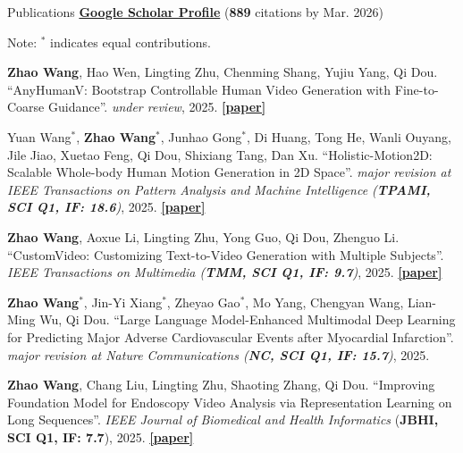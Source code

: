 \documentclass[a4paper]{resume} %
\begin{document}
\begin{rSection}{Publications}
\href{https://scholar.google.com/citations?user=1kEufdwAAAAJ}{\bf Google Scholar Profile} ({\bf 889} citations by Mar. 2026)
\vspace{-0.3em}

Note: {\bf $^*$} indicates equal contributions.

\begin{enumerate}[label={[\arabic*]}, topsep=0em, leftmargin=1.4em, itemsep=-0.5em]

\item {\bf Zhao Wang}, Hao Wen, Lingting Zhu, Chenming Shang, Yujiu Yang, Qi Dou. “AnyHumanV: Bootstrap Controllable Human Video Generation with Fine-to-Coarse Guidance”. {\it under review}, 2025. \href{https://www.arxiv.org/abs/2502.08189}{\bf [paper]}

\item Yuan Wang$^*$, {\bf Zhao Wang}$^*$, Junhao Gong$^*$, Di Huang, Tong He, Wanli Ouyang, Jile Jiao, Xuetao Feng, Qi Dou, Shixiang Tang, Dan Xu. “Holistic-Motion2D: Scalable Whole-body Human Motion Generation in 2D Space”. {\it major revision at IEEE Transactions on Pattern Analysis and Machine Intelligence ({\bf TPAMI, SCI Q1, IF: 18.6})}, 2025. \href{https://arxiv.org/abs/2406.11253}{\bf [paper]}

\item {\bf Zhao Wang}, Aoxue Li, Lingting Zhu, Yong Guo, Qi Dou, Zhenguo Li. “CustomVideo: Customizing Text-to-Video Generation with Multiple Subjects”. {\it IEEE Transactions on Multimedia ({\bf TMM, SCI Q1, IF: 9.7})}, 2025. \href{https://arxiv.org/abs/2401.09962}{\bf [paper]}

\item {\bf Zhao Wang}$^*$,  Jin-Yi Xiang$^*$, Zheyao Gao$^*$, Mo Yang, Chengyan Wang, Lian-Ming Wu, Qi Dou. “Large Language Model-Enhanced Multimodal Deep Learning for Predicting Major Adverse Cardiovascular Events after Myocardial Infarction”. {\it major revision at Nature Communications ({\bf NC, SCI Q1, IF: 15.7})}, 2025. %

\item {\bf Zhao Wang}, Chang Liu, Lingting Zhu, Shaoting Zhang, Qi Dou. “Improving Foundation Model for Endoscopy Video Analysis via Representation Learning on Long Sequences”. {\it IEEE Journal of Biomedical and Health Informatics} ({\bf JBHI, SCI Q1, IF: 7.7}), 2025. \href{https://ieeexplore.ieee.org/abstract/document/10885043}{\bf [paper]}


\end{enumerate}
\end{rSection}
\end{document}
